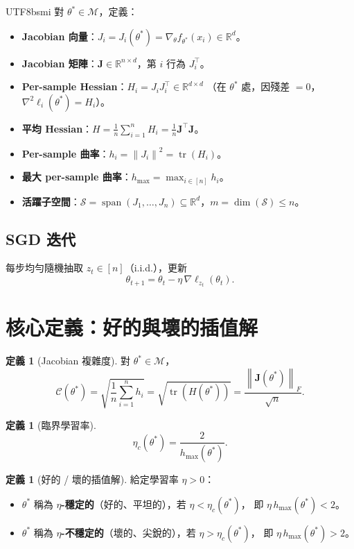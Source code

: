 \documentclass[11pt,a4paper]{article}
\theoremstyle{definition}
\newtheorem{definition}[theorem]{定義}
\DeclareMathOperator{\tr}{tr}
\DeclareMathOperator{\spn}{span}
\newcommand{\R}{\mathbb{R}}
\newcommand{\cM}{\mathcal{M}}
\newcommand{\cS}{\mathcal{S}}
\newcommand{\cC}{\mathcal{C}}
\newcommand{\bJ}{\mathbf{J}}
\newcommand{\norm}[1]{\left\|#1\right\|}
\begin{document}
\begin{CJK}{UTF8}{bsmi}
對 $\theta^* \in \cM$，定義：
\begin{itemize}
  \item \textbf{Jacobian 向量}：$J_i = J_i(\theta^*) = \nabla_\theta f_{\theta^*}(x_i) \in \R^d$。
  \item \textbf{Jacobian 矩陣}：$\bJ \in \R^{n \times d}$，第 $i$ 行為 $J_i^\top$。
  \item \textbf{Per-sample Hessian}：$H_i = J_i J_i^\top \in \R^{d \times d}$
    （在 $\theta^*$ 處，因殘差 $= 0$，$\nabla^2 \ell_i(\theta^*) = H_i$）。
  \item \textbf{平均 Hessian}：$H = \frac{1}{n}\sum_{i=1}^n H_i = \frac{1}{n}\bJ^\top \bJ$。
  \item \textbf{Per-sample 曲率}：$h_i = \norm{J_i}^2 = \tr(H_i)$。
  \item \textbf{最大 per-sample 曲率}：$h_{\max} = \max_{i \in [n]} h_i$。
  \item \textbf{活躍子空間}：$\cS = \spn(J_1, \ldots, J_n) \subseteq \R^d$，$m = \dim(\cS) \leq n$。
\end{itemize}

\subsection{SGD 迭代}

每步均勻隨機抽取 $z_t \in [n]$（i.i.d.），更新
\[
  \theta_{t+1} = \theta_t - \eta\,\nabla\ell_{z_t}(\theta_t).
\]

\section{核心定義：好的與壞的插值解}

\begin{definition}[Jacobian 複雜度]\label{def:jac-complexity}
  對 $\theta^* \in \cM$，
  \[
    \cC(\theta^*) = \sqrt{\frac{1}{n}\sum_{i=1}^n h_i}
    = \sqrt{\tr(H(\theta^*))}
    = \frac{\norm{\bJ(\theta^*)}_F}{\sqrt{n}}.
  \]
\end{definition}

\begin{definition}[臨界學習率]\label{def:eta-c}
  \[
    \eta_c(\theta^*) = \frac{2}{h_{\max}(\theta^*)}.
  \]
\end{definition}

\begin{definition}[好的 / 壞的插值解]\label{def:good-bad}
  給定學習率 $\eta > 0$：
  \begin{itemize}
    \item $\theta^*$ 稱為 \textbf{$\eta$-穩定的}（好的、平坦的），若 $\eta < \eta_c(\theta^*)$，
      即 $\eta\,h_{\max}(\theta^*) < 2$。
    \item $\theta^*$ 稱為 \textbf{$\eta$-不穩定的}（壞的、尖銳的），若 $\eta > \eta_c(\theta^*)$，
      即 $\eta\,h_{\max}(\theta^*) > 2$。
  \end{itemize}
\end{definition}


\end{CJK}
\end{document}

